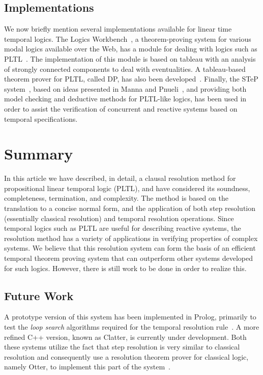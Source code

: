\documentclass[nohyperref]{acmtrans2f}
\begin{document}
\subsection{Implementations}
%
We now briefly mention several implementations
available for linear time temporal logics. The Logics
Workbench~\cite{lwb96}, a theorem-proving system for various modal
logics
available over the Web, has a module for dealing with logics such as
PLTL~\cite{Sch98}. The implementation of this module is based on tableau with an
analysis of strongly connected components to deal with eventualities.
A tableau-based theorem prover for PLTL, called DP, has
also been developed~\cite{Gou84}. 
Finally, the STeP
system~\cite{STeP95}, based on ideas presented in Manna and
Pnueli~, and providing
both model 
checking and deductive methods for PLTL-like logics, has been used in
order to assist the verification of concurrent and reactive systems
based on temporal specifications.

\section{Summary}
\label{sec.conc}
%
In this article we have described, in detail, a clausal resolution
method for propositional linear temporal logic (PLTL), and have
considered its soundness, completeness, termination, and
complexity. The method is based on the translation to a concise normal
form, and the application of both step resolution (essentially
classical resolution) and temporal resolution operations. Since
temporal logics such as PLTL are useful for describing reactive
systems, the resolution method has a variety of applications in
verifying properties of complex systems. We believe that this
resolution system can form the basis of an efficient temporal
theorem proving system that can outperform other systems developed
for such logics. However, there is still work to be done in order to
realize this.  

\subsection{Future Work}
\label{fut.work}
%
A prototype version of this system has been implemented in Prolog,
primarily to test the {\em loop search\/} algorithms required for the
temporal resolution rule~\cite{Dix96-CADE}. A more refined C++
version, known as {\sc Clatter\/}, is currently under
development. Both these systems utilize the fact that step resolution
is very similar to classical resolution and consequently use a
resolution theorem prover for classical logic, namely {\sc Otter}, to
implement this part of the system~\cite{Dix97-ICTL}.
\end{document}
